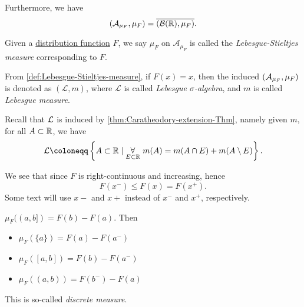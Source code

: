 Furthermore, we have
\[
	(\mathcal{A}_{\mu _F}, \mu _F) = \overline{(\mathcal{B} (\mathbb{\MakeUppercase{r}} ), \mu _F)}.
\]
\begin{definition}\label{def:Lebesgue-Stieltjes-measure}
	Given a \hyperref[def:distribution-function]{distribution function} \(F\), we say \(\mu _F\) on \(\mathcal{A} _{\mu _F}\) is called the
	\emph{Lebesgue-Stieltjes measure} corresponding to \(F\).
\end{definition}

\begin{definition}\label{def:Lebesgue-sigma-algebra}\label{def:Lebesgue-measure}
	From \autoref{def:Lebesgue-Stieltjes-measure}, if \(F(x)=x\), then the induced \((\mathcal{\MakeUppercase{a}} _{\mu _F}, \mu _{F})\) is denoted as \((\mathcal{L} , m)\), where
	\(\mathcal{L} \) is called \emph{Lebesgue \(\sigma\)-algebra}, and \(m\) is called \emph{Lebesgue measure}.
\end{definition}

\begin{remark}
	Recall that \(\mathcal{\MakeUppercase{l}} \) is induced by \autoref{thm:Caratheodory-extension-Thm}, namely given \(m\), for all \(A\subset \mathbb{\MakeUppercase{r}} \),
	we have
	\[
		\mathcal{\MakeUppercase{l}} \coloneqq \left\{A\subset \mathbb{\MakeUppercase{r}} \mid \underset{E\subset \mathbb{\MakeUppercase{r}} }{\forall }\ m(A) = m(A\cap E) + m(A\setminus E)\right\}.
	\]
\end{remark}

\begin{note}
	We see that since \(F\) is right-continuous and increasing, hence
	\[
		F(x^-)\leq F(x) = F(x^+).
	\]
	Some text will use \(x-\) and \(x+\) instead of \(x^-\) and \(x^+\), respectively.
\end{note}

\begin{eg}\label{eg:discrete-measure}
	\(\mu _F((a, b]) = F(b) - F(a)\). Then
	\begin{itemize}
		\item \(\mu _F(\{a\}) = F(a) - F(a^-)\)
		\item \(\mu _F([a, b]) = F(b) - F(a^-)\)
		\item \(\mu _F((a, b)) = F(b^-) - F(a)\)
	\end{itemize}
	This is so-called \emph{discrete measure}.
\end{eg}

